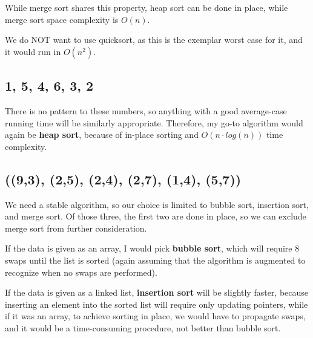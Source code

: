 \documentclass[tikz]{article}
\begin{document}
While merge sort shares this property, heap sort can be done in place, while merge sort space complexity is $O(n)$.

We do NOT want to use quicksort, as this is the exemplar worst case for it, and it would run in $O(n^2)$.

\subsection{1, 5, 4, 6, 3, 2}
There is no pattern to these numbers, so anything with a good average-case running time will be similarly appropriate. Therefore, my go-to algorithm would again be \textbf{heap sort}, because of in-place sorting and $O(n \cdot log(n))$ time complexity.

\subsection{((9,3), (2,5), (2,4), (2,7), (1,4), (5,7))}
We need a stable algorithm, so our choice is limited to bubble sort, insertion sort, and merge sort. Of those three, the first two are done in place, so we can exclude merge sort from further consideration.

If the data is given as an array, I would pick \textbf{bubble sort}, which will require 8 swaps until the list is sorted (again assuming that the algorithm is augmented to recognize when no swaps are performed). 

If the data is given as a linked list, \textbf{insertion sort} will be slightly faster, because inserting an element into the sorted list will require only updating pointers, while if it was an array, to achieve sorting in place, we would have to propagate swaps, and it would be a time-consuming procedure, not better than bubble sort.
\end{document}
